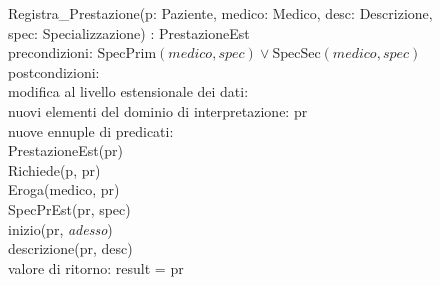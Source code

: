 \documentclass[a4paper,12pt]{report}
\begin{document}
        \hspace*{-0.75cm}
        \hspace*{1cm}Registra\_Prestazione(p: Paziente, medico: Medico, desc: Descrizione, \\
        \hspace*{3cm}spec: Specializzazione) : PrestazioneEst \\
        \hspace*{2cm}precondizioni: $\text{SpecPrim}(medico, spec) \vee \text{SpecSec}(medico, spec)$ \\
        \hspace*{2cm}postcondizioni: \\
        \hspace*{3cm}modifica al livello estensionale dei dati: \\
        \hspace*{4cm}nuovi elementi del dominio di interpretazione: pr \\
        \hspace*{4cm}nuove ennuple di predicati: \\
        \hspace*{5cm}PrestazioneEst(pr) \\
        \hspace*{5cm}Richiede(p, pr) \\
        \hspace*{5cm}Eroga(medico, pr) \\
        \hspace*{5cm}SpecPrEst(pr, spec) \\
        \hspace*{5cm}inizio(pr, \textit{adesso}) \\
        \hspace*{5cm}descrizione(pr, desc) \\
        \hspace*{3cm}valore di ritorno: result = pr \\
\end{document}
